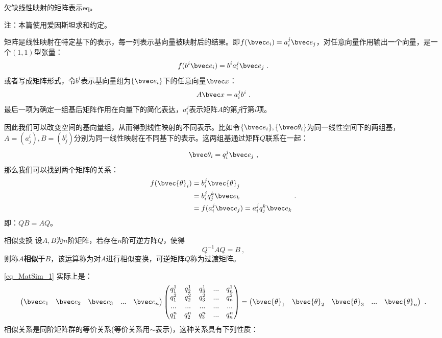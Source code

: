 
\begin{issues}
\issueDraft 欠缺线性映射的矩阵表示eq。
\end{issues}
注：本篇使用爱因斯坦求和约定。

矩阵是线性映射在特定基下的表示，每一列表示基向量被映射后的结果。即$f(\bvec e_i)=a^j_i\bvec e_j$，对任意向量作用输出一个向量，是一个$(1,1)$型张量：
\begin{equation}
f(b^i\bvec e_i)=b^ia^j_i\bvec e_j~.
\end{equation}
或者写成矩阵形式，令$b^i$表示基向量组为$\{\bvec e_i\}$下的任意向量$\bvec x$：
\begin{equation}
A\bvec x= a^j_i b^i~.
\end{equation}
最后一项为确定一组基后矩阵作用在向量下的简化表达，$a^j_i$表示矩阵$A$的第$j$行第$i$项。

因此我们可以改变空间的基向量组，从而得到线性映射的不同表示。比如令$\{\bvec e_i\},\{\bvec \theta_i\}$为同一线性空间下的两组基，$A=(a^i_j),B=(b^i_j)$分别为同一线性映射在不同基下的表示。这两组基通过矩阵$Q$联系在一起：
\begin{equation}\label{eq_MatSim_1}
\bvec \theta_i=q^j_i\bvec e_j~,
\end{equation}
那么我们可以找到两个矩阵的关系：
\begin{equation}
\begin{aligned}
f(\bvec {\theta}_i)&=b^j_i\bvec {\theta}_j\\
&=b^j_i  q^k_j\bvec e_k\\
&=f( a^j_i\bvec e_j)=a^j_iq^k_j\bvec e_k
\end{aligned}~.
\end{equation}
即：$QB=AQ$。
\begin{definition}{相似变换}\label{def_MatSim_1}
设$A,B$为$n$阶矩阵，若存在$n$阶可逆方阵$Q$，使得
\begin{equation}
Q^{-1}AQ=B~,
\end{equation}
则称$A$\textbf{相似}于$B$，该运算称为对$A$进行相似变换，可逆矩阵$Q$称为过渡矩阵。
\end{definition}
\autoref{eq_MatSim_1} 实际上是：
\begin{equation}
\begin{pmatrix}
  \bvec e_1&  \bvec e_2&\bvec e_3&...  &\bvec e_n
\end{pmatrix}
\begin{pmatrix}
  q^1_1& q^1_2 &q^1_3  & ...&q^1_n\\
  q^2_1& q^2_2 &q^2_3  & ...&q^2_n \\
  ...& ... &  ...&...&... \\
 q^n_1& q^n_2 &q^n_3  & ...&q^n_n
\end{pmatrix}=\begin{pmatrix}\bvec {\theta}_1&  \bvec {\theta}_2&\bvec {\theta}_3&... &\bvec {\theta}_n\end{pmatrix}~.
\end{equation}
相似关系是同阶矩阵群的等价关系(等价关系用$\sim $表示)，这种关系具有下列性质：

